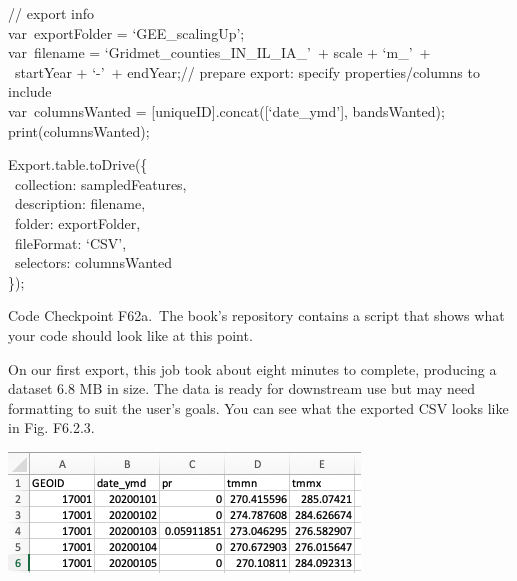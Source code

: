 \documentclass[
  letterpaper,
  DIV=11,
  numbers=noendperiod]{scrreprt}
\begin{document}
// export info\\
var~exportFolder = `GEE\_scalingUp';\\
var~filename = `Gridmet\_counties\_IN\_IL\_IA\_'~+ scale + `m\_'~+\\
\hspace*{0.333em} ~startYear + `-'~+ endYear;// prepare export: specify
properties/columns to include\\
var~columnsWanted = {[}uniqueID{]}.concat({[}`date\_ymd'{]},
bandsWanted);\\
print(columnsWanted);

Export.table.toDrive(\{\\
\hspace*{0.333em} ~collection: sampledFeatures,\\
\hspace*{0.333em} ~description: filename,\\
\hspace*{0.333em} ~folder: exportFolder,\\
\hspace*{0.333em} ~fileFormat: `CSV',\\
\hspace*{0.333em} ~selectors: columnsWanted\\
\});

\begin{tcolorbox}[enhanced jigsaw, left=2mm, breakable, rightrule=.15mm, opacityback=0, colframe=quarto-callout-note-color-frame, colbacktitle=quarto-callout-note-color!10!white, arc=.35mm, opacitybacktitle=0.6, toptitle=1mm, colback=white, leftrule=.75mm, title=\textcolor{quarto-callout-note-color}{\faInfo}\hspace{0.5em}{Note}, toprule=.15mm, bottomtitle=1mm, titlerule=0mm, bottomrule=.15mm, coltitle=black]

Code Checkpoint F62a.~The book's repository contains a script that shows
what your code should look like at this point.

\end{tcolorbox}

On our first export, this job took about eight minutes to complete,
producing a dataset 6.8 MB in size. The data is ready for downstream use
but may need formatting to suit the user's goals. You can see what the
exported CSV looks like in Fig. F6.2.3.

\includegraphics{./F6/image41.png}
\end{document}
